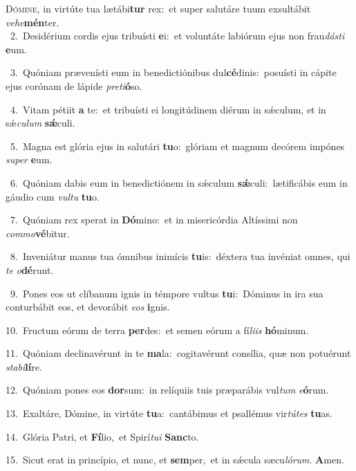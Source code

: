 \lettrine{\initial\textcolor{\initialcolor}{D}}{ómine,} in virtúte tua lætábi\textbf{tur} rex:~\star et super salutáre tuum exsultábit \textit{ve}\-\textit{he}\textbf{mén}ter.\\
{\numbfont\textcolor{\numbcolor}{~2.}}~Desidérium cordis ejus tribuísti \textbf{e}\-i:~\star et voluntáte labiórum ejus non frau\-\textit{dás}\-\textit{ti} \textbf{e}\-um.\par
{\numbfont\textcolor{\numbcolor}{~3.}}~Quóniam prævenísti eum in benedictiónibus dul\-\textbf{cé}\-dinis:~\star posuísti in cápite ejus corónam de lápide \textit{pre}\-\textit{ti}\textbf{ó}so.\par
{\numbfont\textcolor{\numbcolor}{~4.}}~Vitam pétiit \textbf{a} te:~\star et tribuísti ei longitúdinem diérum in sǽculum, et in sǽ\-\textit{cu}\-\textit{lum} \textbf{sǽ}\-culi.\par
{\numbfont\textcolor{\numbcolor}{~5.}}~Magna est glória ejus in salutári \textbf{tu}\-o:~\star glóriam et magnum decórem impónes \textit{su}\-\textit{per} \textbf{e}\-um.\par
{\numbfont\textcolor{\numbcolor}{~6.}}~Quóniam dabis eum in benedictiónem in sǽculum \textbf{sǽ}\-culi:~\star lætificábis eum in gáudio cum \textit{vul}\-\textit{tu} \textbf{tu}\-o.\par
{\numbfont\textcolor{\numbcolor}{~7.}}~Quóniam rex sperat in \textbf{Dó}\-mino:~\star et in misericórdia Altíssimi non \textit{com}\-\textit{mo}\textbf{vé}bitur.\par
{\numbfont\textcolor{\numbcolor}{~8.}}~Inveniátur manus tua ómnibus inimícis \textbf{tu}\-is:~\star déxtera tua invéniat omnes, qui \textit{te} \textit{o}\-\textbf{dé}runt.\par
{\numbfont\textcolor{\numbcolor}{~9.}}~Pones eos ut clíbanum ignis in témpore vultus \textbf{tu}\-i:~\star Dóminus in ira sua conturbábit eos, et devorábit \textit{e}\-\textit{os} \textbf{i}\-gnis.\par
{\numbfont\textcolor{\numbcolor}{10.}}~Fructum eórum de terra \textbf{per}\-des:~\star et semen eórum a fí\-\textit{li}\-\textit{is} \textbf{hó}\-minum.\par
{\numbfont\textcolor{\numbcolor}{11.}}~Quóniam declinavérunt in te \textbf{ma}\-la:~\star cogitavérunt consília, quæ non potuérunt \textit{sta}\-\textit{bi}\textbf{lí}re.\par
{\numbfont\textcolor{\numbcolor}{12.}}~Quóniam pones eos \textbf{dor}\-sum:~\star in relíquiis tuis præparábis vul\textit{tum} \textit{e}\-\textbf{ó}rum.\par
{\numbfont\textcolor{\numbcolor}{13.}}~Exaltáre, Dómine, in virtúte \textbf{tu}\-a:~\star cantábimus et psallémus vir\-\textit{tú}\-\textit{tes} \textbf{tu}\-as.\par
{\numbfont\textcolor{\numbcolor}{14.}}~Glória Patri, et \textbf{Fí}\-lio,~\star et Spirí\-\textit{tu}\-\textit{i} \textbf{Sanc}\-to.\par
{\numbfont\textcolor{\numbcolor}{15.}}~Sicut erat in princípio, et nunc, et \textbf{sem}\-per,~\star et in sǽcula sæcu\-\textit{ló}\-\textit{rum}. \textbf{A}\-men.\par
